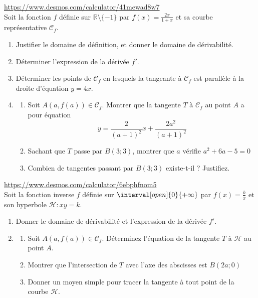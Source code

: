 \documentclass[main.tex]{subfiles}
\begin{document}
\begin{exercise}\hfill \url{https://www.desmos.com/calculator/41mewad8w7} \\
	Soit la fonction $f$ définie sur $\mathbb{R}\setminus\{-1\} $ par   $f(x)=\frac{2x}{1+x} $ et sa courbe représentative $\mathscr{C}_f$. 
		\begin{enumerate}[label={\arabic*)}, leftmargin=*]
		\item Justifier le domaine de définition, et donner le domaine de dérivabilité.
		\item Déterminer l'expression de la dérivée $f'$.
		\item Déterminer les points de $\mathscr{C}_f$ en lesquels la tangeante à $\mathscr{C}_f$ est parallèle à la droite d'équation $y=4x$.
		\item \begin{enumerate}[leftmargin=*]
			\item Soit $A(a,f(a))\in\mathscr{C}_f$. Montrer que la tangente $T$ à $\mathscr{C}_f$ au point $A$ a pour équation
			\setlength{\abovedisplayskip}{3pt}
			\setlength{\belowdisplayskip}{3pt} $$y=\frac{2}{(a+1)^2}x+\frac{2a^2}{(a+1)^2}$$
			\item Sachant que $T$ passe par $B(3;3)$, montrer que $a$ vérifie $a^2+6a-5=0$
			\item Combien de tangentes passant par $B(3;3)$ existe-t-il ? Justifiez.
		\end{enumerate}
	\end{enumerate}  
\end{exercise}  
\begin{exercise} \hfill \url{https://www.desmos.com/calculator/6ebphfnom5} \\
	Soit la fonction inverse $f$ définie sur $\interval[open]{0}{+\infty}$ par   $f(x)=\frac{k}{x}$ et son hyperbole $\mathscr{H}\colon xy=k$. 
	\begin{enumerate}[label={\arabic*)}, leftmargin=*] 
		\item Donner le domaine de dérivabilité et  l'expression de la dérivée $f'$. 
		\item \begin{enumerate}[leftmargin=*]
			\item Soit $A(a,f(a))\in\mathscr{C}_f$. Déterminez l'équation de la tangente $T$ à $\mathscr{H}$ au point $A$.
			\item Montrer que l'intersection de $T$ avec l'axe des abscisses est $B(2a;0)$
			\item Donner un moyen simple pour tracer la tangente à tout point de la courbe $\mathscr{H}$.
		\end{enumerate}
	\end{enumerate}  
\end{exercise} 
\end{document}
